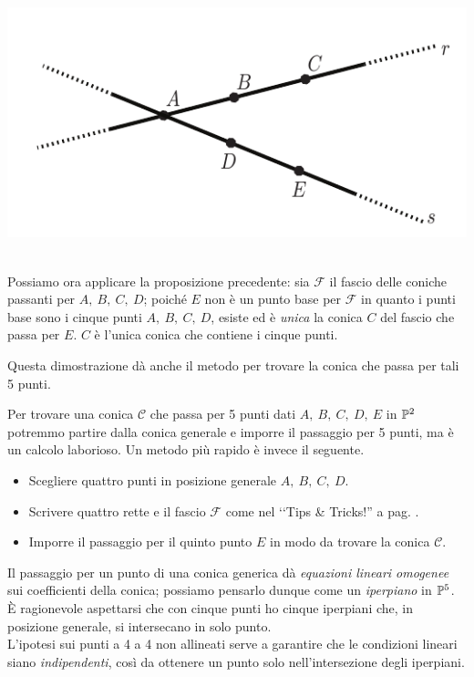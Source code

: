 \begin{demonstration}
\begin{minipage}{0.69\textwidth}
	\end{minipage}
	\begin{minipage}{0.30\textwidth}
		\includegraphics[trim=0cm 0cm 0cm 0cm,clip,scale=0.50]{images/fivepointconic2.pdf}
	\end{minipage}\\
	Possiamo ora applicare la proposizione precedente: sia $\mathcal{F}$ il fascio delle coniche passanti per $A,\ B,\ C,\ D$; poiché $E$ non è un punto base per $\mathcal{F}$ in quanto i punti base sono i cinque punti $A,\ B,\ C,\ D$, esiste ed è \textit{unica} la conica $C$ del fascio che passa per $E$. $C$ è l'unica conica che contiene i cinque punti.
\end{demonstration}
Questa dimostrazione dà anche il metodo per trovare la conica che passa per tali 5 punti.
\begin{tips}
	Per trovare una conica $\mathcal{C}$ che passa per 5 punti dati $A,\ B,\ C,\ D,\ E$ in $\proj[2]{\ }$ potremmo partire dalla conica generale e imporre il passaggio per 5 punti, ma è un calcolo laborioso. Un metodo più rapido è invece il seguente.
		\begin{itemize}
			\item	Scegliere quattro punti in posizione generale $A,\ B,\ C,\ D$.
			\item	Scrivere quattro rette e il fascio $\mathcal{F} $ come nel ‘‘Tips \& Tricks!'' a pag. \pageref{fascio coniche per 4 pt pos gen}.
			\item	Imporre il passaggio per il quinto punto $E$ in modo da trovare la conica $\mathcal{C}$.
		\end{itemize}
	\vspace{-3mm}
\end{tips}
\begin{observe}
	Il passaggio per un punto di una conica generica dà \textit{equazioni lineari omogenee} sui coefficienti della conica; possiamo pensarlo dunque come un \textit{iperpiano} in $\proj[5]{\ }$. È ragionevole aspettarsi che con cinque punti ho cinque iperpiani che, in posizione generale, si intersecano in solo punto.\\
	L'ipotesi sui punti a 4 a 4 non allineati serve a garantire che le condizioni lineari siano \textit{indipendenti}, così da ottenere un punto solo nell'intersezione degli iperpiani.
\end{observe}
